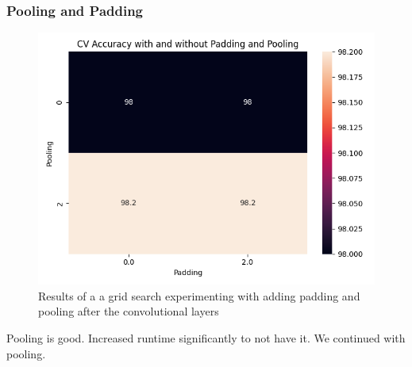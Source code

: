 \subsubsection{Pooling and Padding}
\begin{figure}[H]
    \centering
    \includegraphics[width=\textwidth]{results/cnn_grid_search/heatmap_grid_search_pp.png}
    \caption{Results of a a grid search experimenting with adding padding and pooling after the convolutional layers }
    \label{fig:cnn_pp}
\end{figure}
Pooling is good. Increased runtime significantly to not have it.
We continued with pooling. 

